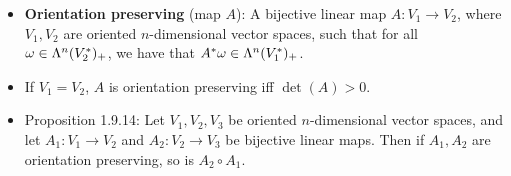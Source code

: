 \documentclass[../notes.tex]{subfiles}
\begin{document}
\begin{itemize}
\begin{proof}
\begin{equation*}
        \end{equation*}
        for all $j=1,\dots,n$. Now as will be explained below, $A$ must have the form
        \begin{equation*}
            A =
            \begin{pmatrix}
                B & C\\
                0 & D\\
            \end{pmatrix}
        \end{equation*}
        where $B$ is the $r\times r$ matrix expressing $\pi(e_1),\dots,\pi(e_r)$ as linear combinations of $\pi(f_1),\dots,\pi(f_r)$, and $D$ is the $k\times k$ matrix expressing the basis vectors $e_{r+1},\dots,e_n$ as linear combinations of $f_{r+1},\dots,f_n$. We have just explained $B$ and $D$. We don't particularly care about $C$ or have a good way of defining its structure. We can, however, take the block labeled zero to be the $k\times r$ zero matrix by Proposition 1.2.9; in particular, since these components of these vectors will be fed into $\pi$ and fall within $W$, they can moved around wherever without altering the identities of the $W$-cosets to which they pertain. Having justified this structure for $A$, we see that we can take
        \begin{equation*}
            \det(A) = \det(B)\det(D)
        \end{equation*}
        It follows by Proposition 1.9.7 as well as the positivity of $\det(A)$ and $\det(B)$ that $\det(D)$ is positive, and hence the orientation of $e_{r+1},\dots,e_n$ and $f_{r+1},\dots,f_n$ are one and the same.
    \end{proof}
    \item \textbf{Orientation preserving} (map $A$): A bijective linear map $A:V_1\to V_2$, where $V_1,V_2$ are oriented $n$-dimensional vector spaces, such that for all $\omega\in\lam[n]{V_2^*}_+$, we have that $A^*\omega\in\lam[n]{V_1^*}_+$.
    \item If $V_1=V_2$, $A$ is orientation preserving iff $\det(A)>0$.
    \item Proposition 1.9.14: Let $V_1,V_2,V_3$ be oriented $n$-dimensional vector spaces, and let $A_1:V_1\to V_2$ and $A_2:V_2\to V_3$ be bijective linear maps. Then if $A_1,A_2$ are orientation preserving, so is $A_2\circ A_1$.
\end{itemize}
\end{document}
